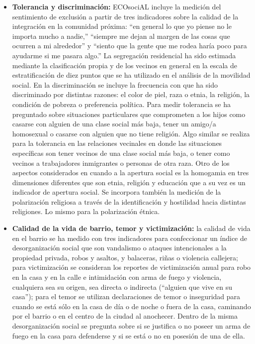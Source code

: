 \documentclass[
  12pt,
]{book}
\begin{document}
\begin{itemize}
\item
  \textbf{Tolerancia y discriminación:} ECOsociAL incluye la medición del sentimiento de exclusión a partir de tres indicadores sobre la calidad de la integración en la comunidad próxima: ``en general lo que yo piense no le importa mucho a nadie,'' ``siempre me dejan al margen de las cosas que ocurren a mi alrededor'' y ``siento que la gente que me rodea haría poco para ayudarme si me pasara algo.'' La segregación residencial ha sido estimada mediante la clasificación propia y de los vecinos en general en la escala de estratificación de diez puntos que se ha utilizado en el análisis de la movilidad social. En la discriminación se incluye la frecuencia con que ha sido discriminado por distintas razones: el color de piel, raza o etnia, la religión, la condición de pobreza o preferencia política. Para medir tolerancia se ha preguntado sobre situaciones particulares que comprometen a los hijos como casarse con alguien de una clase social más baja, tener un amigo/a homosexual o casarse con alguien que no tiene religión. Algo similar se realiza para la tolerancia en las relaciones vecinales en donde las situaciones específicas son tener vecinos de una clase social más baja, o tener como vecinos a trabajadores inmigrantes o personas de otra raza. Otro de los aspectos considerados en cuando a la apertura social es la homogamia en tres dimensiones diferentes que son etnia, religión y educación que a su vez es un indicador de apertura social. Se incorpora también la medición de la polarización religiosa a través de la identificación y hostilidad hacia distintas religiones. Lo mismo para la polarización étnica.
\item
  \textbf{Calidad de la vida de barrio, temor y victimización:} la calidad de vida en el barrio se ha medido con tres indicadores para confeccionar un índice de desorganización social que son vandalismo o ataques intencionales a la propiedad privada, robos y asaltos, y balaceras, riñas o violencia callejera; para victimización se consideran los reportes de victimización anual para robo en la casa y en la calle e intimidación con arma de fuego y violencia, cualquiera sea su origen, sea directa o indirecta (``alguien que vive en su casa''); para el temor se utilizan declaraciones de temor o inseguridad para cuando se está sólo en la casa de día o de noche o fuera de la casa, caminando por el barrio o en el centro de la ciudad al anochecer. Dentro de la misma desorganización social se pregunta sobre si se justifica o no poseer un arma de fuego en la casa para defenderse y si se está o no en posesión de una de ella.
\end{itemize}
\end{document}
